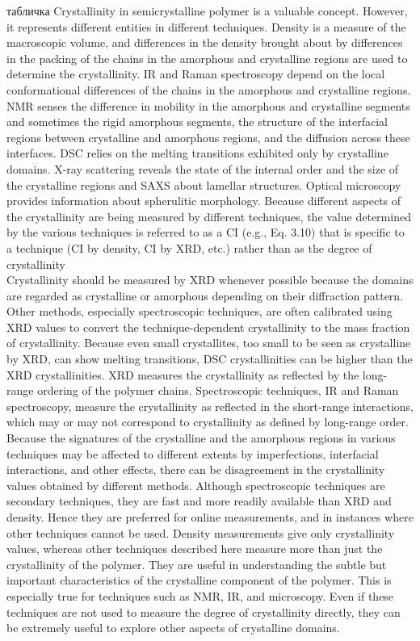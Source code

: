 табличка
Crystallinity in semicrystalline polymer is a valuable concept. However, it represents
different entities in different techniques. Density is a measure of the macroscopic
volume, and differences in the density brought about by differences in the
packing of the chains in the amorphous and crystalline regions are used to determine
the crystallinity. IR and Raman spectroscopy depend on the local conformational
differences of the chains in the amorphous and crystalline regions. NMR senses
the difference in mobility in the amorphous and crystalline segments and sometimes
the rigid amorphous segments, the structure of the interfacial regions between crystalline
and amorphous regions, and the diffusion across these interfaces. DSC relies
on the melting transitions exhibited only by crystalline domains. X-ray scattering reveals the state of the internal order and the size of the crystalline regions and
SAXS about lamellar structures. Optical microscopy provides information about
spherulitic morphology. Because different aspects of the crystallinity are being
measured by different techniques, the value determined by the various techniques
is referred to as a CI (e.g., Eq. 3.10) that is specific to a technique (CI by density,
CI by XRD, etc.) rather than as the degree of crystallinity\\
Crystallinity should
be measured by XRD whenever possible because the domains are regarded as crystalline
or amorphous depending on their diffraction pattern. Other methods, especially
spectroscopic techniques, are often calibrated using XRD values to convert
the technique-dependent crystallinity to the mass fraction of crystallinity. Because
even small crystallites, too small to be seen as crystalline by XRD, can show melting
transitions, DSC crystallinities can be higher than the XRD crystallinities. XRD
measures the crystallinity as reflected by the long-range ordering of the polymer
chains. Spectroscopic techniques, IR and Raman spectroscopy, measure the crystallinity
as reflected in the short-range interactions, which may or may not correspond
to crystallinity as defined by long-range order. Because the signatures of the crystalline
and the amorphous regions in various techniques may be affected to different
extents by imperfections, interfacial interactions, and other effects, there can be
disagreement in the crystallinity values obtained by different methods.
Although spectroscopic techniques are secondary techniques, they are fast and
more readily available than XRD and density. Hence they are preferred for online measurements,
and in instances where other techniques cannot be used. Density measurements
give only crystallinity values, whereas other techniques described here measure
more than just the crystallinity of the polymer. They are useful in understanding the
subtle but important characteristics of the crystalline component of the polymer.
This is especially true for techniques such as NMR, IR, and microscopy. Even if these
techniques are not used to measure the degree of crystallinity directly, they can be
extremely useful to explore other aspects of crystalline domains.









